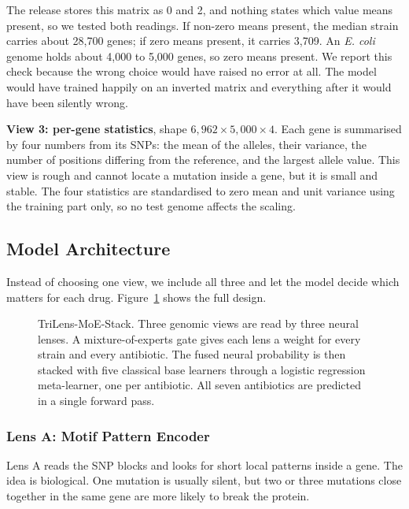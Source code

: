 \documentclass[conference]{IEEEtran}
\begin{document}
The release stores this matrix as 0 and 2, and nothing states which value means
present, so we tested both readings. If non-zero means present, the median strain
carries about 28{,}700 genes; if zero means present, it carries 3{,}709. An
\textit{E. coli} genome holds about 4{,}000 to 5{,}000 genes, so zero means present.
We report this check because the wrong choice would have raised no error at all. The
model would have trained happily on an inverted matrix and everything after it would
have been silently wrong.

\textbf{View 3: per-gene statistics}, shape $6{,}962 \times 5{,}000 \times 4$. Each
gene is summarised by four numbers from its SNPs: the mean of the alleles, their
variance, the number of positions differing from the reference, and the largest
allele value. This view is rough and cannot locate a mutation inside a gene, but it
is small and stable. The four statistics are standardised to zero mean and unit
variance using the training part only, so no test genome affects the scaling.

\subsection{Model Architecture}

Instead of choosing one view, we include all three and let the model decide which
matters for each drug. Figure~\ref{fig:arch} shows the full design.

\begin{figure}[t]
\centering
\resizebox{0.92\textwidth}{!}{}
\caption{TriLens-MoE-Stack. Three genomic views are read by three neural lenses. A
mixture-of-experts gate gives each lens a weight for every strain and every
antibiotic. The fused neural probability is then stacked with five classical base
learners through a logistic regression meta-learner, one per antibiotic. All seven
antibiotics are predicted in a single forward pass.}
\label{fig:arch}
\end{figure}

\subsubsection{Lens A: Motif Pattern Encoder}

Lens A reads the SNP blocks and looks for short local patterns inside a gene. The
idea is biological. One mutation is usually silent, but two or three mutations
close together in the same gene are more likely to break the protein.
\end{document}
